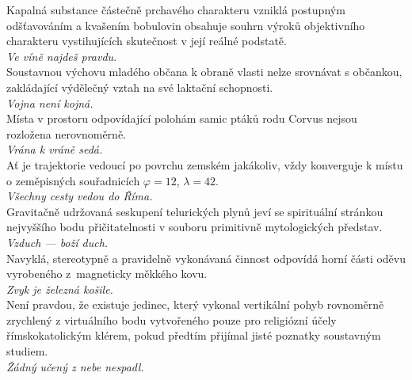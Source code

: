 \begin{multicols}{\value{columnsgames}}
\noindent
Kapalná substance částečně prchavého charakteru vzniklá postupným
odšťavováním a kvašením bobulovin obsahuje souhrn výroků objektivního
charakteru vystihujících skutečnost v její reálné podstatě.\\[1 mm]
{\sl Ve víně najdeš pravdu.}\\

\noindent
Soustavnou výchovu mladého občana k obraně vlasti nelze srovnávat
s občankou, zakládající výdělečný vztah na své laktační schopnosti.\\[1 mm]
{\sl Vojna není kojná.}\\

\noindent
Místa v prostoru odpovídající polohám samic ptáků rodu Corvus
nejsou rozložena nerovnoměrně.\\[1 mm]
{\sl Vrána k vráně sedá.}\\

\noindent
Ať je trajektorie vedoucí po povrchu zemském jakákoliv, vždy
konverguje k místu o zeměpisných souřadnicích $\varphi = 12$,
$\lambda = 42$.\\[1 mm]
{\sl Všechny cesty vedou do Říma.}\\

\noindent
Gravitačně udržovaná seskupení telurických plynů jeví se
spirituální stránkou nejvyššího bodu přičitatelnosti v souboru
primitivně mytologických představ.\\[1 mm]
{\sl Vzduch --- boží duch.}\\

\noindent
Navyklá, stereotypně a pravidelně vykonávaná činnost odpovídá
horní části oděvu vyrobeného z~magneticky měkkého kovu.\\[1 mm]
{\sl Zvyk je železná košile.}\\

\noindent
Není pravdou, že existuje jedinec, který vykonal vertikální pohyb
rovnoměrně zrychlený z virtuálního bodu vytvořeného pouze pro religiózní
účely římskokatolickým klérem, pokud předtím přijímal jisté poznatky
soustavným studiem.\\[1 mm]
{\sl Žádný učený z nebe nespadl.}\\

\end{multicols}
\clearpage

